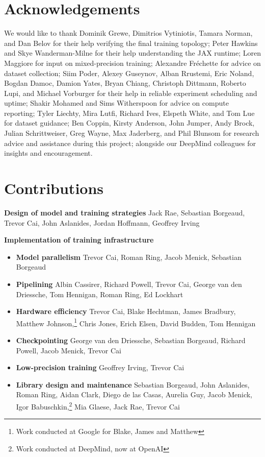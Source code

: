 \documentclass[11pt, a4paper, logo, internal, copyright, nonumbering]{deepmind}
\begin{document}
\section{Acknowledgements}
We would like to thank Dominik Grewe, Dimitrios Vytiniotis, Tamara Norman, and Dan Belov for their help verifying the final training topology; Peter Hawkins and Skye Wanderman-Milne for their help understanding the JAX runtime; Loren Maggiore for input on mixed-precision training; Alexandre Fr\'echette for advice on dataset collection; Siim Poder, Alexey Guseynov, Alban Rrustemi, Eric Noland, Bogdan Damoc, Damion Yates, Bryan Chiang, Christoph Dittmann, Roberto Lupi, and Michael Vorburger for their help in reliable experiment scheduling and uptime; Shakir Mohamed and Sims Witherspoon for advice on compute reporting; Tyler Liechty, Mira Lutfi, Richard Ives, Elspeth White, and Tom Lue for dataset guidance; Ben Coppin, Kirsty Anderson, John Jumper, Andy Brock, Julian Schrittweiser, Greg Wayne, Max Jaderberg, and Phil Blunsom for research advice and assistance during this project; alongside our DeepMind colleagues for insights and encouragement.

\section{Contributions}

\textbf{Design of model and training strategies} Jack Rae, Sebastian Borgeaud, Trevor Cai, John Aslanides, Jordan Hoffmann, Geoffrey Irving

\noindent \textbf{Implementation of training infrastructure}
\begin{itemize}[label={},noitemsep,topsep=0pt]
\itemsep0em
\item \textbf{Model parallelism}
Trevor Cai, Roman Ring, Jacob Menick, Sebastian Borgeaud
\item \textbf{Pipelining}
Albin Cassirer, Richard Powell, Trevor Cai, George van den Driessche, Tom Hennigan, Roman Ring, Ed Lockhart
\item \textbf{Hardware efficiency}
Trevor Cai, Blake Hechtman, James Bradbury, Matthew Johnson,\footnote{Work conducted at Google for Blake, James and Matthew} Chris Jones, Erich Elsen, David Budden, Tom Hennigan
\item \textbf{Checkpointing}
George van den Driessche, Sebastian Borgeaud, Richard Powell, Jacob Menick, Trevor Cai
\item \textbf{Low-precision training}
Geoffrey Irving, Trevor Cai
\item \textbf{Library design and maintenance}
Sebastian Borgeaud, John Aslanides, Roman Ring, Aidan Clark, Diego de las Casas, Aurelia Guy, Jacob Menick, Igor Babuschkin,\footnote{Work conducted at DeepMind, now at OpenAI} Mia Glaese, Jack Rae, Trevor Cai
\end{itemize}
\end{document}
